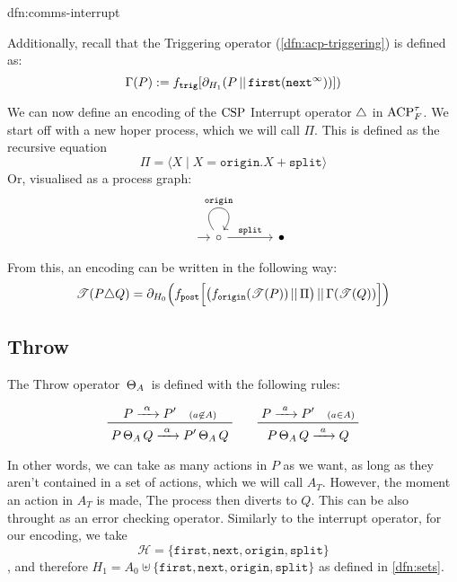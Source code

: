 \documentclass[../hons_project.tex]{subfiles}
\begin{document}
\begin{dfn}{dfn:comms-interrupt}{}
	\longrule{0.08ex}

	Additionally, recall that the Triggering operator (\ref{dfn:acp-triggering}) is defined as:
	\[\Gamma(P) := f_{\mathtt{trig}}[\partial_{H_{1}}(P \merge \mathtt{first}(\mathtt{next}^{\infty}))])\]
\end{dfn}

We can now define an encoding of the $\csp$ Interrupt operator $\interrupt$ in $\acptf$. We start off with a new hoper process, which we will call $\Pi$. This is defined as the recursive equation
\[\Pi = \langle X \mid X = \mathtt{origin}.X + \mathtt{split} \rangle\]
Or, visualised as a process graph:
\[\begin{tikzcd}[column sep=scriptsize, row sep=scriptsize]
		{} & \circ && \bullet
		\arrow[shorten <=8pt, from=1-1, to=1-2]
		\arrow["{\mathtt{origin}}", from=1-2, to=1-2, loop, in=55, out=125, distance=10mm]
		\arrow["{\mathtt{split}}", from=1-2, to=1-4]
	\end{tikzcd}\]

From this, an encoding can be written in the following way:
\[\trans{P \interrupt Q} = \partial_{H_{0}}\Bigl(f_{\mathtt{post}}\Bigl[ \bigl(f_{\mathtt{origin}}(\trans{P}) \merge \Pi\bigr) \merge \Gamma(\trans{Q}) \Bigr]\Bigr)\]
\subsection{Throw}\label{ssec:throw}

The Throw operator $\throw$ is defined with the following rules:

\[\prftree{P \prightarrow{\alpha} P' \quad \scriptstyle(a\not\in A)}{P \throw Q \prightarrow{\alpha} P' \throw Q} \qquad \prftree{P \prightarrow{a} P' \quad \scriptstyle(a\in A)}{P \throw Q \prightarrow{a} Q }\]

In other words, we can take as many actions in $P$ as we want, as long as they aren't contained in a set of actions, which we will call $A_{T}$. However, the moment an action in $A_{T}$ is made, The process then diverts to $Q$. This can be also throught as an error checking operator. Similarly to the interrupt operator, for our encoding, we take
\[\mathscr{H} = \{\mathtt{first}, \mathtt{next}, \mathtt{origin}, \mathtt{split}\}\]
, and therefore $H_{1} = A_{0} \uplus \{\mathtt{first}, \mathtt{next}, \mathtt{origin}, \mathtt{split}\}$ as defined in \ref{dfn:sets}.
\end{document}
